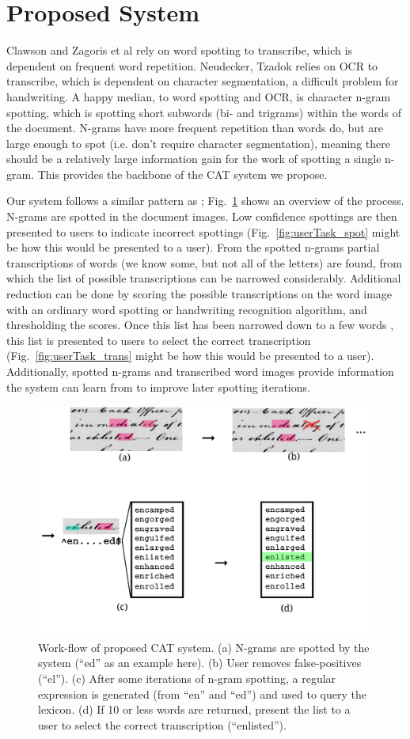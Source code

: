\documentclass[conference]{IEEEtran}
\begin{document}
\section{Proposed System}
Clawson\cite{Clawson2014} and Zagoris et al\cite{Zagoris2015} rely on word spotting to transcribe, which is dependent on frequent word repetition. Neudecker, Tzadok\cite{Neudecker2010} relies on OCR to transcribe, which is dependent on character segmentation, a difficult problem for handwriting.
A happy median, to word spotting and OCR, is character n-gram spotting, which is spotting short subwords (bi- and trigrams) within the words of the document. N-grams have more frequent repetition than words do, but are large enough to spot (i.e. don't require character segmentation), meaning there should be a relatively large information gain for the work of spotting a single n-gram. This provides the backbone of the CAT system we propose.


Our system follows a similar pattern as \cite{Neudecker2010}; Fig.~\ref{fig:system_diagram} shows an overview of the process. N-grams are spotted in the document images. Low confidence spottings are then presented to users to indicate incorrect spottings (Fig.~\ref{fig:userTask_spot} might be how this would be presented to a user). From the spotted n-grams partial transcriptions of words (we know some, but not all of the letters) are found, from which the list of possible transcriptions can be narrowed considerably. Additional reduction can be done by scoring the possible transcriptions on the word image with an ordinary word spotting or handwriting recognition algorithm, and thresholding the scores. Once this list has been narrowed down to a few words , this list is presented to users to select the correct transcription (Fig.~\ref{fig:userTask_trans} might be how this would be presented to a user). Additionally, spotted n-grams and transcribed word images provide information the system can learn from to improve later spotting iterations.

\begin{figure}
    \centering
    \includegraphics[width=.45\textwidth]{flow5}
    \caption{Work-flow of proposed CAT system. (a) N-grams are spotted by the system (``ed'' as an example here). (b) User removes false-positives (``el''). (c) After some iterations of n-gram spotting, a regular expression is generated (from ``en'' and ``ed'') and used to query the lexicon. (d) If 10 or less words are returned, present the list to a user to select the correct transcription (``enlisted'').}
    \label{fig:system_diagram}
\end{figure}
\end{document}
